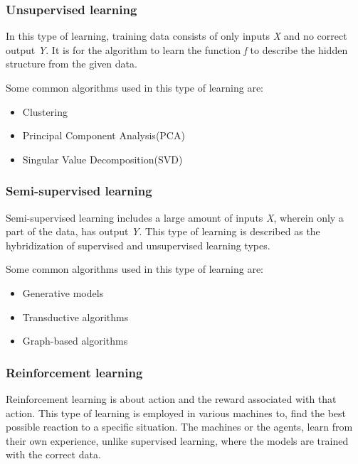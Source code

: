 \subsubsection{Unsupervised learning} \label{Unsupervised learning}


In this type of learning, training data consists of only inputs \textit{X} and no correct output \textit{Y}. It is for the algorithm to learn the function \textit{f} to describe the hidden structure from the given data.

\par 

Some common algorithms used in this type of learning are: 
\begin{itemize}
    \item Clustering
    \item Principal Component Analysis(PCA)
    \item Singular Value Decomposition(SVD)
\end{itemize}

\subsubsection{Semi-supervised learning} \label{Semi supervised learning}

Semi-supervised learning includes a large amount of inputs \textit{X}, wherein only a part of the data, has output \textit{Y}. This type of learning is described as the hybridization of supervised and unsupervised learning types. 

\par

Some common algorithms used in this type of learning are: 
\begin{itemize}
    \item Generative models
    \item Transductive algorithms
    \item  Graph-based algorithms
\end{itemize}

\subsubsection{Reinforcement learning}\label{Reinforcement learning}

Reinforcement learning is about action and the reward associated with that action. This type of learning is employed in various machines to, find the best possible reaction to a specific situation. The machines or the agents, learn from their own experience, unlike supervised learning, where the models are trained with the correct data. 
 

